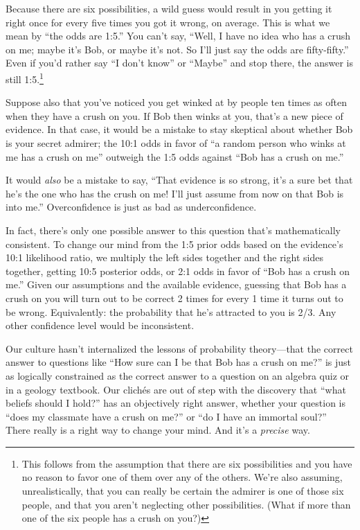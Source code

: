 {
 Because there are six possibilities, a wild guess would result in
you getting it right once for every five times you got it wrong, on
average. This is what we mean by ``the odds are
1:5.'' You can't say,
``Well, I have no idea who has a crush on me; maybe
it's Bob, or maybe it's not. So
I'll just say the odds are
fifty-fifty.'' Even if you'd rather
say ``I don't know''
or ``Maybe'' and stop there, the
answer is still 1:5.\footnote{This follows from the assumption that there are six
possibilities and you have no reason to favor one of them over any of
the others. We're also assuming, unrealistically, that
you can really be certain the admirer is one of those six people, and
that you aren't neglecting other possibilities. (What
if more than one of the six people has a crush on you?)}}

{
 Suppose also that you've noticed you get winked at
by people ten times as often when they have a crush on you. If Bob then
winks at you, that's a new piece of evidence. In that
case, it would be a mistake to stay skeptical about whether Bob is your
secret admirer; the 10:1 odds in favor of ``a random
person who winks at me has a crush on me'' outweigh
the 1:5 odds against ``Bob has a crush on
me.''}

{
 It would \textit{also} be a mistake to say,
``That evidence is so strong, it's a
sure bet that he's the one who has the crush on me!
I'll just assume from now on that Bob is into
me.'' Overconfidence is just as bad as
underconfidence.}

{
 In fact, there's only one possible answer to this
question that's mathematically consistent. To change
our mind from the 1:5 prior odds based on the
evidence's 10:1 likelihood ratio, we multiply the left
sides together and the right sides together, getting 10:5 posterior
odds, or 2:1 odds in favor of ``Bob has a crush on
me.'' Given our assumptions and the available
evidence, guessing that Bob has a crush on you will turn out to be
correct 2 times for every 1 time it turns out to be wrong.
Equivalently: the probability that he's attracted to
you is 2/3. Any other confidence level would be inconsistent.}

{
 Our culture hasn't internalized the lessons of
probability theory---that the correct answer to questions like
``How sure can I be that Bob has a crush on
me?'' is just as logically constrained as the correct
answer to a question on an algebra quiz or in a geology textbook. Our
clichés are out of step with the discovery that ``what
beliefs should I hold?'' has an objectively right
answer, whether your question is ``does my classmate
have a crush on me?'' or ``do I have
an immortal soul?'' There really is a right way to
change your mind. And it's a \textit{precise} way.}

